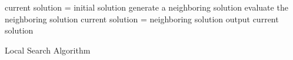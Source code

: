 \begin{algorithm2e}[h]
	current solution = initial solution\;
	{
		generate a neighboring solution\;
		evaluate the neighboring solution\;
		{
			current solution = neighboring solution\;
		}
	}
	output current solution\;
	\caption{Local Search Algorithm}
	\label{algo:local_search}
\end{algorithm2e}